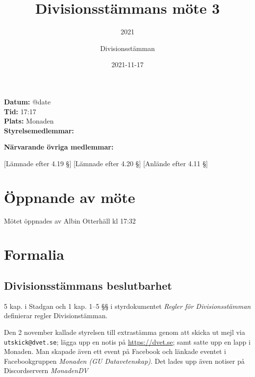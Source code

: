 \documentclass[protokoll]{dvd}
\begin{document}
\title{Divisionsstämmans möte 3}
\subtitle{2021}
\author{Divisionsstämman}
\date{2021-11-17}

\textbf{Datum:} \csname @date\endcsname\\
\textbf{Tid:} 17:17\\
\textbf{Plats:} Monaden\\
\textbf{Styrelsemedlemmar:}
\begin{närvarande_förtroendevalda}
\end{närvarande_förtroendevalda}

\textbf{Närvarande övriga medlemmar:}
\begin{närvarande_medlemmar}
    [Lämnade efter 4.19 §]
    [Lämnade efter 4.20 §]
    [Anlände efter 4.11 §]
\end{närvarande_medlemmar}

\section{Öppnande av möte}

Mötet öppnades av Albin Otterhäll kl 17:32

\newpage
\section{Formalia}


\subsection{Divisionsstämmans beslutbarhet}

5 kap. i Stadgan och 1 kap. 1--5 §§ i styrdokumentet \emph{Regler för Divisionsstämman} definierar regler Divisionstämman.

Den 2 november kallade styrelsen till extrastämma genom att skicka ut mejl via \verb|utskick@dvet.se|; lägga upp en notis på \url{https://dvet.se}; samt satte upp en lapp i Monaden.
Man skapade även ett event på Facebook och länkade eventet i Facebookgruppen \emph{Monaden (GU Datavetenskap)}.
Det lades upp även notiser på Discordservern \emph{MonadenDV}
\end{document}
